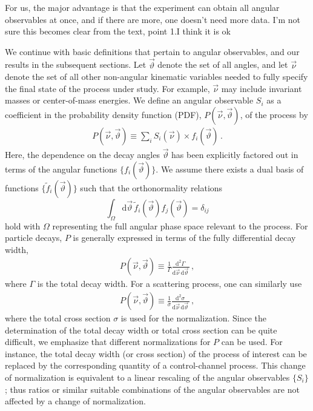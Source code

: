 \documentclass[aps,nofootinbib,preprintnumbers,prd,twocolumn]{revtex4-1}
\newcommand{\dual}[1]{\tilde{#1}}
\newcommand{\nuvec}{\vec{\nu}}
\newcommand{\rmdx}[1]{\mbox{d} #1 \,} %
\newcommand{\thvec}{\vec{\vartheta}}
\renewcommand{\theta}{\vartheta}
\newcommand{\fred}[1]{{\color{brown!85!black}#1}}
\newcommand{\marcin}[1]{{\color{cyan}#1}}
\newcommand{\add}[1]{\textcolor{green!85!black}{#1}}
\begin{document}
\fred{For us, the major advantage is that the experiment can obtain all angular observables at once, and if there are more, one doesn't need more data. I'm not sure this becomes clear from the text, point 1.}\marcin{I think it is ok}

We continue with basic definitions that pertain to angular observables, and our
results in the subsequent sections. Let $\thvec$ denote the set of all
angles, and let $\nuvec$ denote the set of all
other non-angular kinematic variables needed to fully specify the
final state of the process under study. For example, $\nuvec$ may
include invariant masses or center-of-mass energies. We define an
angular observable $S_i$ as a coefficient in the probability density
function (PDF), $P(\nuvec, \thvec)$, of the process by
\begin{align}
    \label{eq:def-P}
    P(\nuvec, \thvec) \equiv \sum_i S_i(\nuvec) \times f_i(\thvec)\,.
\end{align}
Here, the dependence on the decay angles $\thvec$ has been
explicitly factored out in terms of the angular functions
$\{f_i(\thvec)\}$. We assume there exists a dual basis of functions
$\{\dual{f}_i(\thvec)\}$ such that the orthonormality relations
\begin{equation}
    \label{eq:def-ortho-rel}
    \int_\Omega \rmdx{\vec{\theta}} \dual{f}_i(\thvec) f_j(\thvec)  = \delta_{ij}
\end{equation}
hold with $\Omega$ representing the full angular phase space relevant
to the process.  For particle decays, $P$ is generally expressed in
terms of the fully differential decay width,
\begin{align}
    \label{eq:def-P-decay}
    P(\nuvec, \thvec) \equiv \frac{1}{\Gamma}\frac{\rmdx{^{2}\Gamma}}{\rmdx{\vec\nu} \rmdx{\vec\theta}}\,,
\end{align}
where $\Gamma$ is the total decay width. For a scattering process, one can similarly use
\begin{align}
    \label{eq:def-P-scattering}
    P(\nuvec, \thvec) \equiv \frac{1}{\sigma}\frac{\rmdx{^{2}\sigma}}{\rmdx{\vec\nu} \rmdx{\vec\theta}}\,,
\end{align}
where the total cross section $\sigma$ is used for the
normalization. Since the determination of the total decay width or
total cross section can be quite difficult, we emphasize that
different normalizations for $P$ can be used.  For instance, the total
decay width (or cross section) of the process of interest can be
replaced by the corresponding quantity of a control-channel
process. This change of normalization is equivalent to a linear rescaling of
the angular observables $\lbrace S_i\rbrace$; thus ratios or similar suitable combinations
of the angular observables are not affected by \add{a} change of normalization.\\
\end{document}
